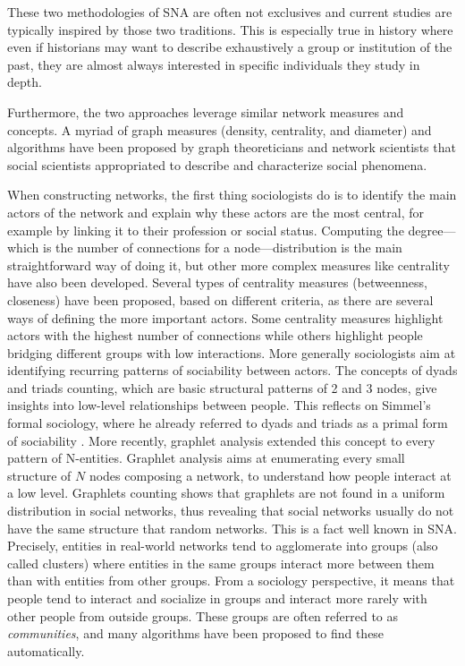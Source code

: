 These two methodologies of SNA are often not exclusives and current studies are typically inspired by those two traditions.
This is especially true in history where even if historians may want to describe exhaustively a group or institution of the past, they are almost always interested in specific individuals they study in depth.

Furthermore, the two approaches leverage similar network measures and concepts.
A myriad of graph measures (\eg density, centrality, and diameter) and algorithms have been proposed by graph theoreticians and network scientists that social scientists appropriated to describe and characterize social phenomena.

When constructing networks, the first thing sociologists do is to identify the main actors of the network and explain why these actors are the most central, for example by linking it to their profession or social status.
Computing the degree---which is the number of connections for a node---distribution is the main straightforward way of doing it, but other more complex measures like centrality have also been developed.
Several types of centrality measures (\eg betweenness, closeness) have been proposed, based on different criteria, as there are several ways of defining the more important actors.
Some centrality measures highlight actors with the highest number of connections while others highlight people bridging different groups with low interactions.
More generally sociologists aim at identifying recurring patterns of sociability between actors.
The concepts of dyads and triads counting, which are basic structural patterns of 2 and 3 nodes, give insights into low-level relationships between people.
This reflects on Simmel's formal sociology, where he already referred to dyads and triads as a primal form of sociability \cite{Simmel2013}.
More recently, graphlet analysis extended this concept to every pattern of N-entities.
Graphlet analysis aims at enumerating every small structure of $N$ nodes composing a network, to understand how people interact at a low level.
Graphlets counting shows that graphlets are not found in a uniform distribution in social networks, thus revealing that social networks usually do not have the same structure that random networks.
This is a fact well known in SNA. Precisely, entities in real-world networks tend to agglomerate into groups (also called clusters) where entities in the same groups interact more between them than with entities from other groups.
From a sociology perspective, it means that people tend to interact and socialize in groups and interact more rarely with other people from outside groups.
These groups are often referred to as \emph{communities}, and many algorithms have been proposed to find these automatically.



